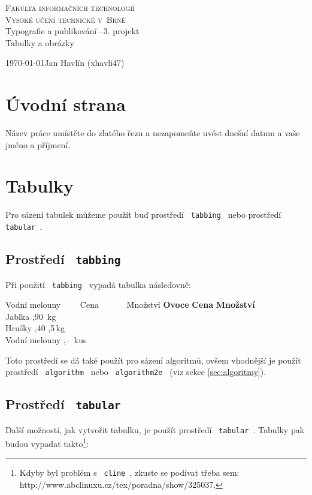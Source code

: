 \documentclass[11pt,a4paper]{article}
\begin{document}
\begin{titlepage}
\begin{center}
	\Huge
	\textsc{Fakulta informačních technologií} \\
	\textsc{Vysoké učení technické v~Brně}\\
	\LARGE
	Typografie a publikování\,--\,3. projekt \\
	Tabulky a obrázky
\end{center}
{\Large \today \hfill Jan Havlín (xhavli47)}
\end{titlepage}

\section{Úvodní strana}
Název práce umístěte do zlatého řezu a nezapomeňte uvést dnešní datum a vaše jméno a příjmení.

\section{Tabulky}
Pro sázení tabulek můžeme použít buď prostředí \texttt{ tabbing } nebo prostředí \texttt{ tabular }.

\subsection{Prostředí \texttt{ tabbing }}
Při použití \texttt{ tabbing } vypadá tabulka následovně:
\begin{tabbing}
Vodní melouny~~~~ \= Cena~~~~~~ \= Množství \kill
\textbf{Ovoce} \> \textbf{Cena} \> \textbf{Množství} \\
Jablka ,90 \,kg \\
Hrušky ,40 ,5\,kg \\
Vodní melouny ,-- \,kus \\
\end{tabbing}

\noindent Toto prostředí se dá také použít pro sázení algoritmů, ovšem vhodnější je použít prostředí \texttt{ algorithm } nebo \texttt{ algorithm2e } (viz sekce \ref{sec:algoritmy}).

\subsection{Prostředí \texttt{ tabular }}
Další možností, jak vytvořit tabulku, je použít prostředí \texttt{ tabular }. Tabulky pak budou vypadat takto\footnote{Kdyby byl problém s \texttt{ cline }, zkuste se podívat třeba sem: http://www.abclinuxu.cz/tex/poradna/show/325037.}:
\end{document}
